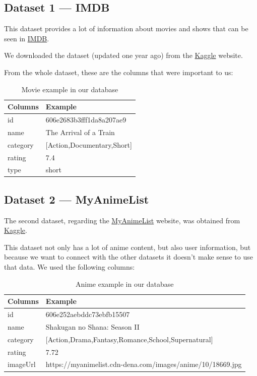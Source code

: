 \documentclass{article}
\newcommand*\fpar{\hspace{1ex}}
\begin{document}
  \subsection{Dataset 1 — IMDB}
  \label{sec:movies}
  \fpar This dataset provides a lot of information about movies and shows that can be seen in \href{https://www.imdb.com}{IMDB}.
  \par We downloaded the dataset (updated one year ago) from the \href{https://www.kaggle.com/ashirwadsangwan/imdb-dataset}{Kaggle} website.
  \par From the whole dataset, these are the columns that were important to us:
  \begin{table}[H]
    \centering
    \begin{tabular}{l|l}
      Columns & Example                     \\ \hline
      id      & 606e2683b3fff1da8a207ae9    \\
      name    & The Arrival of a Train      \\
      category& [Action,Documentary,Short]  \\
      rating  & 7.4                         \\
      type    & short
    \end{tabular}
    \caption{Movie example in our database}
    \label{table:movie}
  \end{table}

  \subsection{Dataset 2 — MyAnimeList}
  \label{sec:animes}
  \fpar The second dataset, regarding the \href{https://myanimelist.net/}{MyAnimeList} website, was obtained from \href{https://www.kaggle.com/azathoth42/myanimelist}{Kaggle}.
  \par This dataset not only has a lot of anime content, but also user information, but because we want to connect with the other datasets it doesn't make sense to use that data. We used the following columns:
  \begin{table}[H]
    \centering
    \begin{tabular}{l|l}
      Columns & Example                       \\ \hline
      id      & 606e252aebddc73ebfb15507      \\
      name    & Shakugan no Shana: Season II  \\
      category& [Action,Drama,Fantasy,Romance,School,Supernatural]  \\
      rating  & 7.72                          \\
      imageUrl& https://myanimelist.cdn-dena.com/images/anime/10/18669.jpg
    \end{tabular}
    \caption{Anime example in our database}
    \label{table:anime}
  \end{table}
\end{document}

